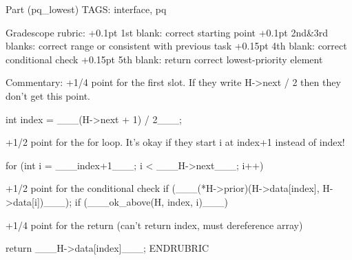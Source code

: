 \RUBRIC
Part (pq_lowest)
TAGS: interface, pq

Gradescope rubric:
+0.1pt 1st blank: correct starting point
+0.1pt 2nd&3rd blanks: correct range or consistent with previous task
+0.15pt 4th blank: correct conditional check
+0.15pt 5th blank: return correct lowest-priority element

Commentary:
  +1/4 point for the first slot. If they write H->next / 2 then
  they don't get this point.

      int index = ___(H->next + 1) / 2___;

  +1/2 point for the for loop. It's okay if they start i at
  index+1 instead of index!

      for (int i = ___index+1___; i < ___H->next___; i++)

  +1/2 point for the conditional check
        if (___(*H->prior)(H->data[index], H->data[i])___);
        if (___ok_above(H, index, i)___)

  +1/4 point for the return (can't return index, must dereference array)

      return ___H->data[index]___;
ENDRUBRIC
